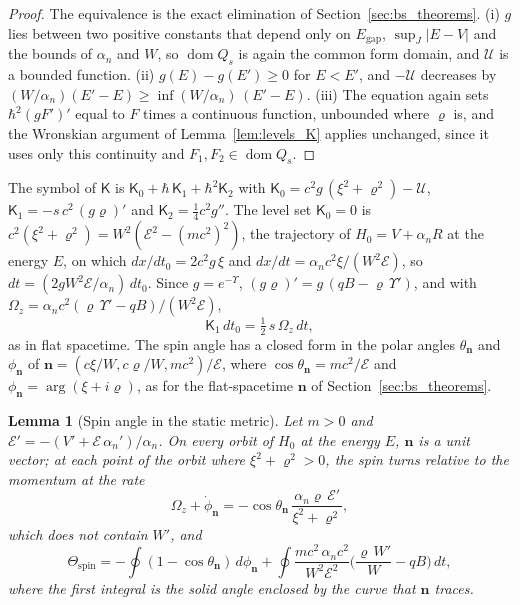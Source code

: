 \documentclass[aps,prd,onecolumn,tightenlines,nofootinbib,notitlepage,11pt,floatfix]{revtex4-2}
\theoremstyle{indentedtheorem}
\newtheorem{lemma}{Lemma}
\begin{document}
\begin{proof}
The equivalence is the exact elimination of Section~\ref{sec:bs_theorems}. (i) $g$ lies between two positive constants that depend only on $E_\text{gap}$, $\sup_J|E-V|$ and the bounds of $\alpha_n$ and $W$, so $\operatorname{dom}Q_s$ is again the common form domain, and $\mathcal{U}$ is a bounded function. (ii) $g(E)-g(E')\geq0$ for $E<E'$, and $-\mathcal{U}$ decreases by $(W/\alpha_n)(E'-E)\geq\inf(W/\alpha_n)\,(E'-E)$. (iii) The equation again sets $\hbar^2(gF')'$ equal to $F$ times a continuous function, unbounded where $\varrho$ is, and the Wronskian argument of Lemma~\ref{lem:levels_K} applies unchanged, since it uses only this continuity and $F_1,F_2\in\operatorname{dom}Q_s$.
\end{proof}

The symbol of $\mathsf{K}$ is $\mathsf{K}_0+\hbar\,\mathsf{K}_1+\hbar^2\mathsf{K}_2$ with $\mathsf{K}_0=c^2g\,(\xi^2+\varrho^2)-\mathcal{U}$, $\mathsf{K}_1=-s\,c^2\,(g\varrho)'$ and $\mathsf{K}_2=\tfrac{1}{4}c^2g''$. The level set $\mathsf{K}_0=0$ is $c^2(\xi^2+\varrho^2)=W^2(\mathcal{E}^2-(mc^2)^2)$, the trajectory of $H_0=V+\alpha_nR$ at the energy $E$, on which $dx/dt_0=2c^2g\,\xi$ and $dx/dt=\alpha_nc^2\xi/(W^2\mathcal{E})$, so $dt=(2gW^2\mathcal{E}/\alpha_n)\,dt_0$. Since $g=e^{-\Upsilon}$, $(g\varrho)'=g\,(qB-\varrho\,\Upsilon')$, and with $\Omega_z=\alpha_nc^2(\varrho\,\Upsilon'-qB)/(W^2\mathcal{E})$,
\begin{equation*}
    \mathsf{K}_1\,dt_0 = \tfrac{1}{2}\,s\,\Omega_z\,dt ,
\end{equation*}
as in flat spacetime. The spin angle has a closed form in the polar angles $\theta_\mathbf{n}$ and $\phi_\mathbf{n}$ of $\mathbf{n}=(c\xi/W,c\varrho/W,mc^2)/\mathcal{E}$, where $\cos\theta_\mathbf{n}=mc^2/\mathcal{E}$ and $\phi_\mathbf{n}=\arg(\xi+i\varrho)$, as for the flat-spacetime $\mathbf{n}$ of Section~\ref{sec:bs_theorems}.

\begin{lemma}[Spin angle in the static metric]\label{lem:grav_spin}
Let $m>0$ and $\mathcal{E}'=-(V'+\mathcal{E}\,\alpha_n')/\alpha_n$. On every orbit of $H_0$ at the energy $E$, $\mathbf{n}$ is a unit vector; at each point of the orbit where $\xi^2+\varrho^2>0$, the spin turns relative to the momentum at the rate
\begin{equation*}
    \Omega_z+\dot{\phi}_\mathbf{n} = -\cos\theta_\mathbf{n}\,\frac{\alpha_n\varrho\,\mathcal{E}'}{\xi^2+\varrho^2} ,
\end{equation*}
which does not contain $W'$, and
\begin{equation*}
    \Theta_\text{spin} = -\oint(1-\cos\theta_\mathbf{n})\,d\phi_\mathbf{n} + \oint\frac{mc^2\,\alpha_nc^2}{W^2\mathcal{E}^2}\Big(\frac{\varrho\,W'}{W}-qB\Big)\,dt ,
\end{equation*}
where the first integral is the solid angle enclosed by the curve that $\mathbf{n}$ traces.
\end{lemma}
\end{document}
